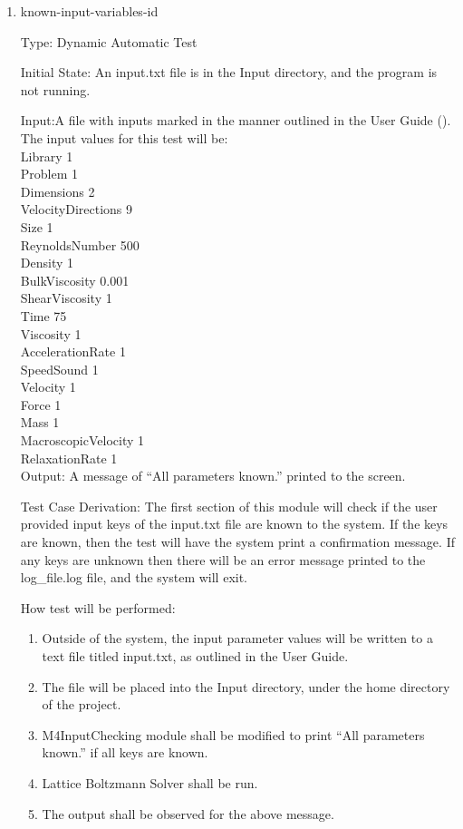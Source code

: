 \documentclass[12pt, titlepage]{article}
\newcommand{\myprogname}{Lattice Boltzmann Solver}
\newcounter{uvtestcounter} %
\begin{document}
\begin{enumerate}
	
	\item{known-input-variables-id\theuvtestcounter\\}
	
	Type: Dynamic Automatic Test

	Initial State: An input.txt file is in the Input directory, and the program is not running.

	Input:A file with inputs marked in the manner outlined in the
User Guide (\citet{LBM_UserGuide_PM}).\\The input values for this test will
be:\\

Library 1\\
Problem 1\\
Dimensions 2\\
VelocityDirections 9\\
Size 1\\
ReynoldsNumber 500\\
Density 1\\
BulkViscosity 0.001\\
ShearViscosity 1\\
Time 75\\
Viscosity 1\\
AccelerationRate 1\\
SpeedSound 1\\
Velocity 1\\
Force 1\\
Mass 1\\
MacroscopicVelocity 1\\
RelaxationRate 1\\

Output: A message of ``All parameters known.'' printed to the screen.

Test Case Derivation:  The first section of this module will check if the user provided input keys of the input.txt file are known to the system. If the keys are known, then the test will have the system print a confirmation message. If any keys are unknown then there will be an error message printed to the log\_file.log file, and the system will exit.  

How test will be performed: 
\begin{enumerate}
	\item Outside of the system, the input parameter values will be written to a text file titled input.txt, as outlined in the User Guide.
	\item The file will be placed into the Input directory, under the home directory of the project.
	\item M4InputChecking module shall be modified to print ``All parameters known.'' if all keys are known.
	\item {\myprogname} shall be run. 
	\item The output shall be observed for the above message.
\end{enumerate}
	

\end{enumerate}
\end{document}
